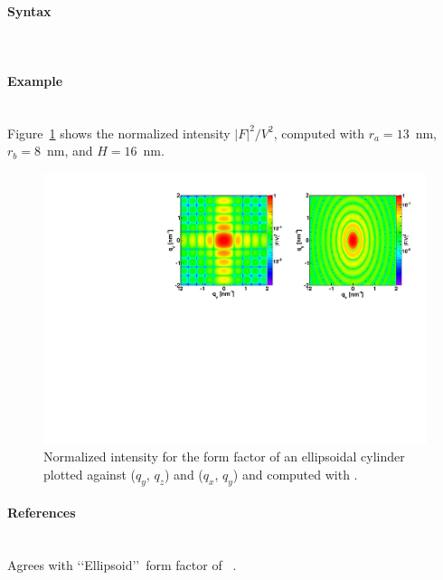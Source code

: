 \paragraph{Syntax}\strut\\

\newpage


\paragraph{Example}\strut\\
Figure~\ref{fig:FFellipscylinderEx} shows the normalized intensity
$|F|^2/V^2$, computed with $r_a=13$~nm, $r_b=8$~nm, and $H=16$~nm.
\begin{figure}[ht]
\begin{center}
\includegraphics[angle=-90,width=\textwidth]{fig/ff/figffellipscylinder.pdf}
\end{center}
\caption{Normalized intensity for the form factor of an ellipsoidal
  cylinder plotted against ($q_y$, $q_z$) and ($q_x$,
  $q_y$) and computed with .}
\label{fig:FFellipscylinderEx}
\end{figure}

\paragraph{References}\strut\\
Agrees with \lq\lq Ellipsoid\rq\rq\ form factor of \IsGISAXS~\cite{Laz02}.

\newpage
